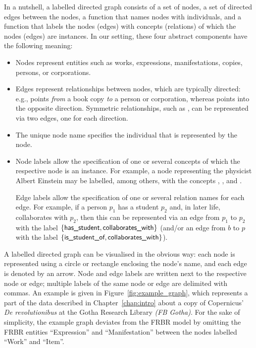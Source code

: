 In a nutshell, a labelled directed graph consists of a set of nodes, a set of directed edges between
the nodes, a function that names nodes with individuals,
and a function that labels the nodes (edges) with concepts (relations)
of which the nodes (edges) are instances.
In our setting, these four abstract components have the following meaning:
%
\begin{itemize}
  \item 
    Nodes represent entities such as works, expressions, manifestations, copies,
    persons, or corporations.
  \item 
    Edges represent relationships between nodes, which are typically directed:
    e.g.,  points \emph{from} a book copy \emph{to} a person or corporation,
    whereas  points into the opposite direction.
    Symmetric relationships, such as ,
    can be represented via two edges, one for each direction.
  \item 
    The unique node name specifies the individual that is represented by the node.
  \item 
    Node labels allow the specification of one or several concepts
    of which the respective node is an instance.
    For example, a node representing the physicist Albert Einstein
    may be labelled, among others, with the concepts , ,
    and .

    Edge labels allow the specification of one or several relation names for each edge.
    For example, if a person $p_1$ has a student $p_2$ and, in later life, 
    collaborates with $p_2$, then this can be represented via an edge from $p_1$ to $p_2$
    with the label $\{\textsf{has\_student},\textsf{collaborates\_with}\}$
    (and/or an edge from $b$ to $p$ with the label $\{\textsf{is\_student\_of},\textsf{collaborates\_with}\}$).
\end{itemize}
%
A labelled directed graph can be visualised in the obvious way:
each node is represented using a circle or rectangle
enclosing the node's name,
and each edge is denoted by an arrow.
Node and edge labels are written next to the respective node or edge;
multiple labels of the same node or edge are delimited with commas.
An example is given in Figure~\ref{fig:example_graph},
which represents a part of the data described in Chapter~\ref{chap:intro}
about a copy of Copernicus' \emph{De revolutionibus} at the
Gotha Research Library \emph{(FB Gotha)}.
For the sake of simplicity, the example graph deviates from the FRBR model
by omitting the FRBR entities ``Expression'' and ``Manifestation'' between the nodes labelled ``Work'' and ``Item''.

